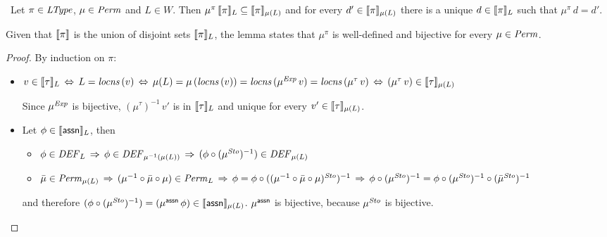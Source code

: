 \documentclass[12pt,a4paper]{report}
\newcommand{\Sto}{\nstyle{Sto}}
\newcommand{\DEF}{\nstyle{DEF}}
\begin{document}
\begin{lemma} \
  Let $\pi \in \mathit{LType}$, $\mu\in\mathit{Perm}$ and $L\in W$.
  Then $\mu^\pi\,\llbracket\pi\rrbracket_L \subseteq \llbracket\pi\rrbracket_{\mu(L)}$ and
  for every $d'\in\llbracket\pi\rrbracket_{\mu(L)}$ there is
  a unique $d\in\llbracket\pi\rrbracket_{L}$ such that $\mu^\pi\,d = d'$.
\end{lemma}

Given that $\llbracket\pi\rrbracket$ is the union of disjoint sets $\llbracket\pi\rrbracket_L$, the lemma
states that $\mu^\pi$ is well-defined and bijective for every $\mu\in\mathit{Perm}$.

\begin{proof}
  By induction on $\pi$:
  \begin{itemize}
    \item $v \in \llbracket\tau\rrbracket_L \\
           \,\Leftrightarrow\,
           L = \mathit{locns}\,(v) \\
           \,\Leftrightarrow\,
           \mu(L) = \mu\,(\mathit{locns}\,(v)) = \mathit{locns}\,(\mu^{\mathit{Exp}}\,v) = \mathit{locns}\,(\mu^\tau\,v) \\
           \,\Leftrightarrow\,
           (\mu^\tau\,v) \in \llbracket\tau\rrbracket_{\mu(L)}$

          Since $\mu^{\mathit{Exp}}$ is bijective, $(\mu^\tau)^{-1}\,v'$ is in
          $\llbracket\tau\rrbracket_L$ and unique for every $v'\in\llbracket\tau\rrbracket_{\mu(L)}$.

    \item Let $\phi \in \llbracket\mathsf{assn}\rrbracket_L$, then
          \begin{itemize}
            \item $\phi\in\DEF_L
                   \,\Rightarrow\,
                   \phi\in\DEF_{\mu^{-1}(\mu(L))}
                   \,\Rightarrow\,
                   (\phi \circ (\mu^\Sto)^{-1}) \in \DEF_{\mu(L)}$

            \item $\bar{\mu}\in\Perm_{\mu(L)} \\
                   \,\Rightarrow\,
                   (\mu^{-1}\circ \bar{\mu} \circ \mu) \in \Perm_L \\
                   \,\Rightarrow\,
                   \phi = \phi \circ ((\mu^{-1}\circ \bar{\mu} \circ \mu)^\Sto)^{-1} \\
                   \,\Rightarrow\,
                   \phi\circ (\mu^\Sto)^{-1} = \phi \circ (\mu^\Sto)^{-1} \circ (\bar{\mu}^\Sto)^{-1}$
          \end{itemize}
          and therefore $(\phi\circ(\mu^\Sto)^{-1}) = (\mu^\tassn\,\phi) \in \semantic{\tassn}_{\mu(L)}$.
          $\mu^{\mathsf{assn}}$ is bijective, because $\mu^\Sto$ is bijective.


\end{itemize}
\end{proof}
\end{document}
